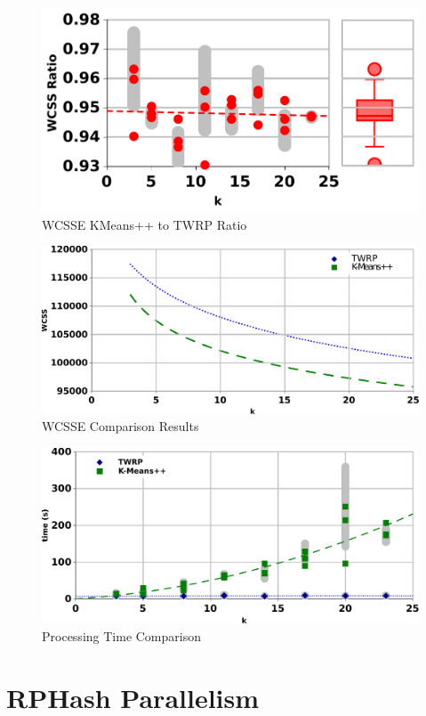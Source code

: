 \begin{figure}[t]
        \centering
        \includegraphics[width=.75\textwidth]{figs/w2vratio_wcss.pdf}
	\caption{WCSSE KMeans++ to \textsf{TWRP} Ratio}\label{w2vratio}
\end{figure}
\begin{figure}[t] 
        \centering
        \includegraphics[width=.85\textwidth]{figs/w2vwcss.pdf}
	\caption{WCSSE Comparison Results}\label{w2vwcss}
\end{figure}
\begin{figure}[t]
        \centering
	\includegraphics[width=.85\linewidth]{figs/w2vtime.pdf}
	\caption{Processing Time Comparison}\label{w2vproctime}
\end{figure}


\section{RPHash Parallelism}

